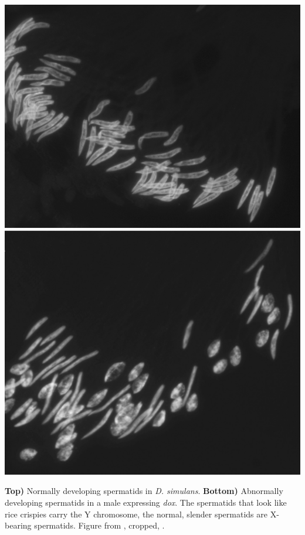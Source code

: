{\begin{marginfigure}
\begin{center}
\includegraphics[width= \textwidth]{Journal_figs/single_locus_selection/Winters_sex_ratio_drive/Winters_sex_ratio_drive_sperm.jpg}

\end{center}
\caption{{\bf Top)} Normally developing spermatids in {\it D.
  simulans}. {\bf Bottom)}  Abnormally developing spermatids in a male
expressing {\it dox}. The spermatids that look like
  rice crispies carry the Y chromosome,  the normal, slender
  spermatids are X-bearing spermatids.  Figure from
  \citet{tao2007sex}, cropped, \PLOSccBY. } \label{fig:winters_sperm}
\end{marginfigure}

}
